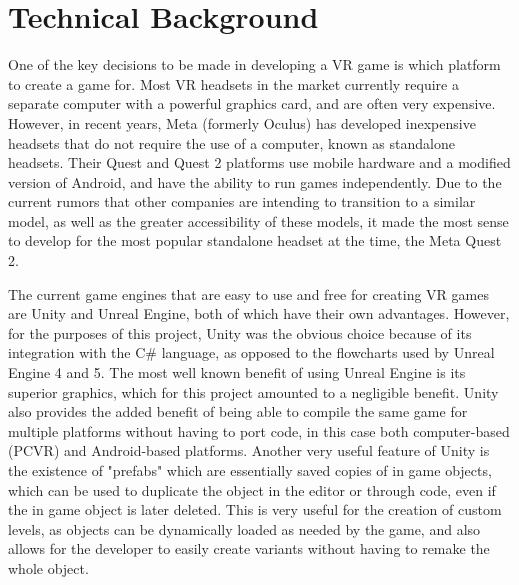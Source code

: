 \documentclass[10pt,twocolumn]{article}
\begin{document}
\section{Technical Background}
One of the key decisions to be made in developing a VR game is which platform to create a game for. Most VR headsets in the market currently require a separate computer with a powerful graphics card, and are often very expensive. However, in recent years, Meta (formerly Oculus) has developed inexpensive headsets that do not require the use of a computer, known as standalone headsets. Their Quest and Quest 2 platforms use mobile hardware and a modified version of Android, and have the ability to run games independently. Due to the current rumors that other companies are intending to transition to a similar model\cite{FutureStandalone}, as well as the greater accessibility of these models, it made the most sense to develop for the most popular standalone headset at the time, the Meta Quest 2.

The current game engines that are easy to use and free for creating VR games are Unity and Unreal Engine, both of which have their own advantages. However, for the purposes of this project, Unity was the obvious choice because of its integration with the C\# language, as opposed to the flowcharts used by Unreal Engine 4 and 5. The most well known benefit of using Unreal Engine is its superior graphics, which for this project amounted to a negligible benefit. Unity also provides the added benefit of being able to compile the same game for multiple platforms without having to port code, in this case both computer-based (PCVR) and Android-based platforms. Another very useful feature of Unity is the existence of "prefabs" which are essentially saved copies of in game objects, which can be used to duplicate the object in the editor or through code, even if the in game object is later deleted. This is very useful for the creation of custom levels, as objects can be dynamically loaded as needed by the game, and also allows for the developer to easily create variants without having to remake the whole object.
\end{document}
